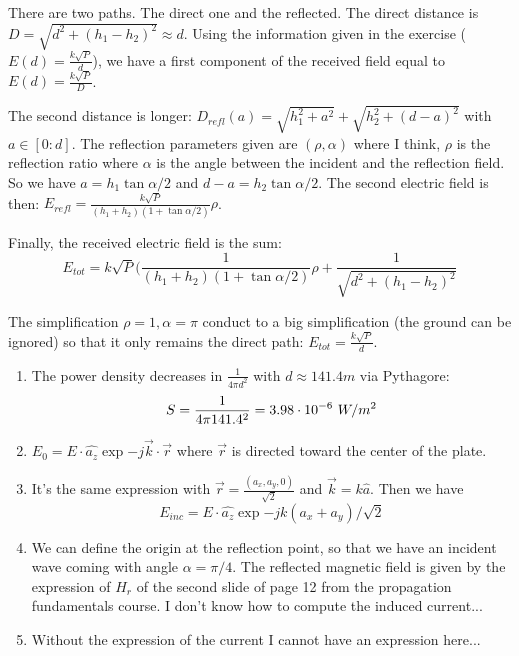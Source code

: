 
\begin{solution}
	There are two paths. The direct one and the reflected. The direct distance is $D = \sqrt{d^2 + (h_1 - h_2)^2} \approx d$. Using the information given in the exercise ($E(d) = \frac{k\sqrt{P}}{d}$), we have a first component of the received field equal to $E(d) = \frac{k\sqrt{P}}{D}$.

	
	The second distance is longer: $D_{refl}(a) = \sqrt{h_1^2 + a^2} + \sqrt{h_2^2 + (d - a)^2}$ with $a \in [0:d]$. 	
	The reflection parameters given are $(\rho, \alpha)$ where I think, $\rho$ is the reflection ratio where $\alpha$ is the angle between the incident and the reflection field. So we have $a = h_1 \tan{\alpha/2}$ and $d - a = h_2 \tan{\alpha/2}$. 
	The second electric field is then: $E_{refl} = \frac{k\sqrt{P}}{(h_1 + h_2)(1 + \tan{\alpha/2})}\rho$.
	
	
	Finally, the received electric field is the sum:
	$$E_{tot} = k\sqrt{P} (\frac{1}{(h_1 + h_2)(1 + \tan{\alpha/2})}\rho + \frac{1}{\sqrt{d^2 + (h_1 - h_2)^2}}$$

	
	The simplification $\rho = 1, \alpha = \pi$ conduct to a big simplification (the ground can be ignored) so that it only remains the direct path: $E_{tot} = \frac{k\sqrt{P}}{d}$.
\end{solution}

\begin{solution}
	\begin{enumerate}
		\item The power density decreases in $\frac{1}{4\pi d^2}$ with $d \approx 141.4m$ via Pythagore:
			  $$ S = \frac{1}{4\pi 141.4^2} = 3.98\cdot 10^{-6}~W/m^2 $$
			  
		\item $E_0 = E \cdot \hat{a_z} \exp{-j\vec{k} \cdot \vec{r}}$ where $\vec{r}$ is directed toward the center of the plate.
		
		\item It's the same expression with $\vec{r} = \frac{(a_x, a_y, 0)}{\sqrt{2}}$ and $\vec{k} = k \hat{a}$. Then we have 
			  $$E_{inc} = E \cdot \hat{a_z} \exp{-j k (a_x + a_y)/\sqrt{2}}$$ 

			  \notsure
			  
			  
		\item We can define the origin at the reflection point, so that we have an incident wave coming with angle $\alpha = \pi/4$. The reflected magnetic field is given by the expression of $H_r$ of the second slide of page 12 from the propagation fundamentals course.
			  \notsure I don't know how to compute the induced current...
			  
		\item Without the expression of the current I cannot have an expression here... \notsure
	\end{enumerate}
\end{solution}

